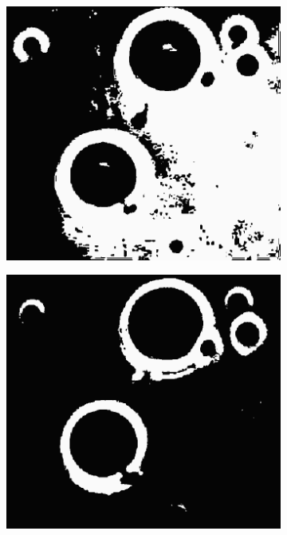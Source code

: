 \begin{figure}[h!]
\begin{subfigure}[b]{0.45\linewidth}
    	\caption{}
    	\label{fig:polymersomes_hist}
  	\end{subfigure}
  	\begin{subfigure}[b]{0.45\linewidth}
		\includegraphics[width=\linewidth]{myfigure/p9/9_threshold_basic.png}
		\caption{}
		\label{fig:threshold_basic}
	\end{subfigure}
	\begin{subfigure}[b]{0.45\linewidth}
		\includegraphics[width=\linewidth]{myfigure/p9/9_threshold_otsu.png}
		\caption{}
		\label{fig:threshold_otsu}
	\end{subfigure}
	

\end{figure}
